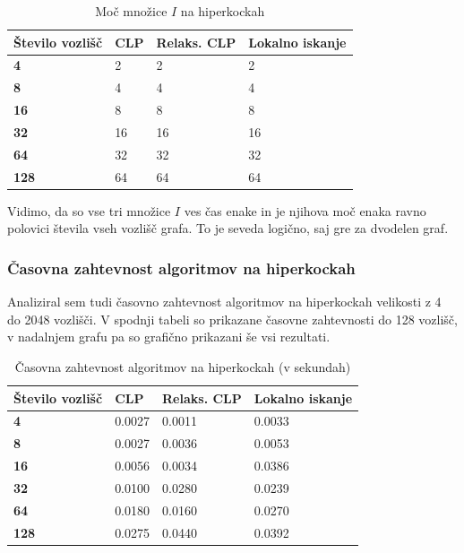 \documentclass[a4paper, 12 pt]{article}
\theoremstyle{definition}
\theoremstyle{plain}
\theoremstyle{remark}
\begin{document}
\begin{table}[H]
\centering
\begin{tabular}{|p{3cm}||p{1cm}|p{2.7cm}|p{3.2cm}|}
\hline
\textbf{Število vozlišč}  & \textbf{CLP} & \textbf{Relaks. CLP} & \textbf{Lokalno iskanje} \\ \hline
\textbf{4}     & 2 &2  &2  \\ \hline
\textbf{8}    & 4 & 4 &4  \\ \hline
\textbf{16}   & 8 & 8  &8  \\ \hline
\textbf{32}  & 16 &16  &16  \\ \hline
\textbf{64}   & 32 & 32 &  32 \\ \hline
\textbf{128} & 64 & 64 & 64  \\ \hline
\end{tabular}
\caption{Moč množice $I$ na hiperkockah}
\label{fig:hipekocka I} 
\end{table}
Vidimo, da so vse tri množice $I$ ves čas enake in je njihova moč enaka ravno polovici števila vseh vozlišč grafa. To je seveda logično, saj gre za dvodelen graf. 

\newpage
\subsubsection{Časovna zahtevnost algoritmov na hiperkockah}
Analiziral sem tudi časovno zahtevnost algoritmov na hiperkockah velikosti z 4 do 2048 vozlišči.
V spodnji tabeli so prikazane časovne zahtevnosti do 128 vozlišč, v nadalnjem grafu pa so grafično prikazani še vsi rezultati.

\begin{table}[H]
\centering
\begin{tabular}{|p{3cm}||p{2.8cm}|p{2.8cm}|p{3.2cm}|}
\hline
\textbf{Število vozlišč}  & \textbf{CLP} & \textbf{Relaks. CLP} & \textbf{Lokalno iskanje} \\ \hline
\textbf{4}&	0.0027&	0.0011	&0.0033\\ \hline
\textbf{8}&	0.0027	&0.0036	&0.0053\\ \hline
\textbf{16}&0.0056	&0.0034	&0.0386\\ \hline
\textbf{32}&0.0100&	0.0280	&0.0239\\ \hline
\textbf{64}&0.0180	&0.0160	&0.0270\\ \hline
\textbf{128}&0.0275	&0.0440	&0.0392\\ \hline
\end{tabular}
\caption{Časovna zahtevnost algoritmov na hiperkockah (v sekundah)}
\label{fig:hipekocka I} 
\end{table}
\end{document}
